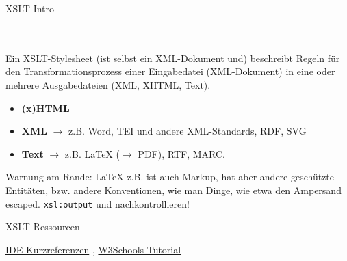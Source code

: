 \begin{frame}[allowframebreaks]{XSLT-Intro}

\\
\\

Ein XSLT-Stylesheet (ist selbst ein XML-Dokument und) beschreibt Regeln für den  Transformationsprozess einer Eingabedatei (XML-Dokument) in eine oder
mehrere Ausgabedateien (XML, XHTML, Text). 
\smallskip

\begin{itemize}
    \item \textbf{(x)HTML} \item \textbf{XML} $\to$ z.B. Word, TEI und andere XML-Standards, RDF, SVG \item \textbf{Text} $\to$ z.B. LaTeX ($\to$ PDF), RTF, MARC.
\end{itemize}

\alert{Warnung am Rande:} \LaTeX{} z.B. ist auch Markup, hat aber andere geschützte Entitäten, bzw. andere Konventionen, wie man Dinge, wie etwa den Ampersand escaped. \texttt{xsl:output} und nachkontrollieren!

\end{frame}

\begin{frame}[allowframebreaks]{XSLT Ressourcen}

\href{https://www.i-d-e.de/?s=referenz}{IDE Kurzreferenzen}
\sep 
\href{https://www.w3schools.com/xml/xsl_intro.asp}{W3Schools-Tutorial}

\end{frame}



